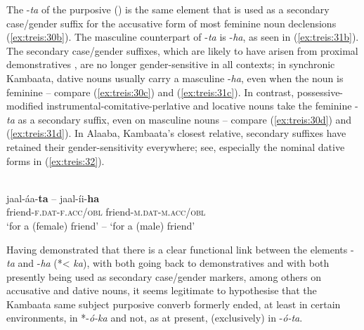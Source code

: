 \documentclass[output=paper,colorlinks,citecolor=brown,
]{langsci/langscibook}
\begin{document}
The \nobreakdash-\textit{ta} of the purposive () is the same element that is used as a secondary case\slash gender suffix for the accusative form of most feminine noun declensions (\ref{ex:treis:30b}). The masculine counterpart of \nobreakdash-\textit{ta} is \nobreakdash-\textit{ha}, as seen in (\ref{ex:treis:31b}). The secondary case\slash gender suffixes, which are likely to have arisen from proximal demonstratives \citep[128--130]{Treis2008}, are no longer gender-sensitive in all contexts; in synchronic Kambaata, dative nouns usually carry a masculine \nobreakdash-\textit{ha}, even when the noun is feminine -- compare (\ref{ex:treis:30c}) and (\ref{ex:treis:31c}). In contrast, possessive-modified instrumental-comitative-perlative and locative nouns take the feminine \nobreakdash-\textit{ta} as a secondary suffix, even on masculine nouns -- compare (\ref{ex:treis:30d}) and (\ref{ex:treis:31d}). In Alaaba, Kambaata's closest relative, secondary suffixes have retained their gender-sensitivity everywhere; see, especially the nominal dative forms in (\ref{ex:treis:32}).

\ea\label{ex:treis:32}
\\
\gll jaal-áa-\textbf{ta} -- jaal-íi-\textbf{ha}\\
friend-\textsc{f.dat-f.acc/obl} {} friend-\textsc{m.dat-m.acc/obl}\\
\glt `for a (female) friend' -- `for a (male) friend'
\z

Having demonstrated that there is a clear functional link between the elements \nobreakdash-\textit{ta} and \nobreakdash-\textit{ha} (*< \textit{ka}), with both going back to demonstratives and with both presently being used as secondary case\slash gender markers, among others on accusative and dative nouns, it seems legitimate to hypothesise that the Kambaata same subject purposive converb formerly ended, at least in certain environments, in *-\textit{ó-ka} and not, as at present, (exclusively) in \nobreakdash-\textit{ó-ta}.
\end{document}

